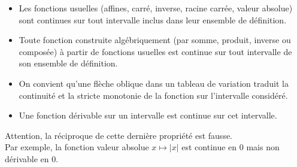\documentclass{cornouaille}
\begin{document}
\begin{propriete}
\begin{itemize}
\item Les fonctions usuelles (affines, carré, inverse, racine carrée, valeur absolue) sont continues sur tout intervalle inclus dans  leur ensemble de définition.
\item Toute fonction construite algébriquement (par somme, produit, inverse ou composée) à partir de fonctions usuelles est continue  sur tout intervalle de son ensemble de définition.
\item On convient qu'une flèche oblique dans un tableau de variation traduit la continuité
et la stricte monotonie de la fonction sur l’intervalle considéré.
\item Une fonction dérivable sur un intervalle est continue sur cet intervalle.
  \end{itemize}
\end{propriete}

\begin{remarque}
Attention, la réciproque de cette dernière propriété est fausse.\\
Par exemple, la fonction valeur absolue $x\mapsto |x|$ est continue en 0 mais non dérivable en 0.
\end{remarque}

\newcommand{\lcro}{\textcolor{B2}{\textbf{\textsf{]}}}}
\newcommand{\rcro}{\textcolor{B2}{\textbf{\textsf{[}}}}
\end{document}
